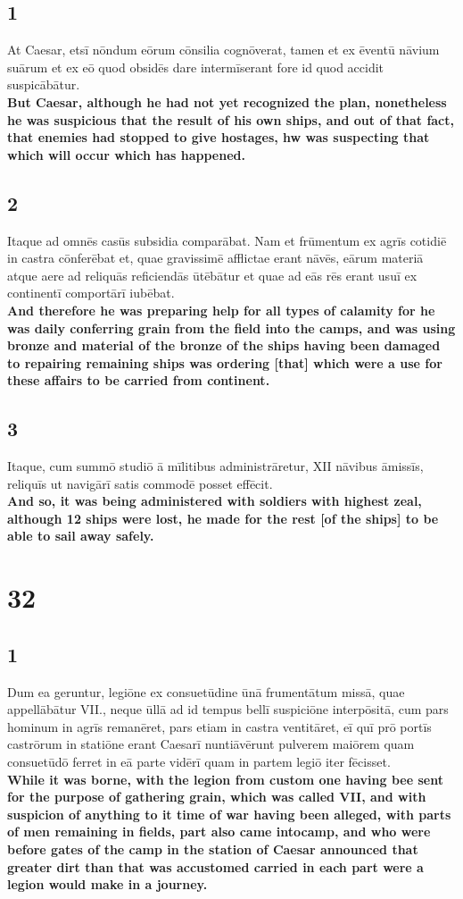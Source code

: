 \documentclass{article}
\begin{document}
\subsection*{1}
At Caesar, etsī nōndum eōrum cōnsilia cognōverat, tamen et ex ēventū nāvium suārum et ex eō quod obsidēs dare intermīserant fore id quod accidit suspicābātur. \\
\textbf{But Caesar, although he had not yet recognized the plan, nonetheless he was suspicious that the result of his own ships, and out of that fact, that enemies had stopped to give hostages, hw was suspecting that which will occur which has happened. }

\subsection*{2}
Itaque ad omnēs casūs subsidia comparābat. Nam et frūmentum ex agrīs cotidiē in castra cōnferēbat et, quae gravissimē afflictae erant nāvēs, eārum materiā atque aere ad reliquās reficiendās ūtēbātur et quae ad eās rēs erant usuī ex continentī comportārī iubēbat. \\
\textbf{And therefore he was preparing help for all types of calamity for he was daily conferring grain from the field into the camps, and was using bronze and material of the bronze of the ships having been damaged to repairing remaining ships was ordering [that] which were a use for these affairs  to be carried from continent.}

\subsection*{3}
Itaque, cum summō studiō ā mīlitibus administrāretur, XII nāvibus āmissīs, reliquīs ut navigārī satis commodē posset effēcit.\\
\textbf{And so, it was being administered with soldiers with highest zeal, although 12 ships were lost, he made for the rest [of the ships] to be able to sail away safely.}


\section*{32}
\subsection*{1}
Dum ea geruntur, legiōne ex consuetūdine ūnā frumentātum missā, quae appellābātur VII., neque ūllā ad id tempus bellī suspiciōne interpōsitā, cum pars hominum in agrīs remanēret, pars etiam in castra ventitāret, eī quī prō portīs castrōrum in statiōne erant Caesarī nuntiāvērunt pulverem maiōrem quam consuetūdō ferret in eā parte vidērī quam in partem legiō iter fēcisset.\\
\textbf{While it was borne, with the legion from custom one having bee sent for the purpose of gathering grain, which was called VII, and with suspicion of anything to it time of war having been alleged, with parts of men remaining in fields, part also came intocamp, and who were before gates of the camp in the station of Caesar announced that greater dirt than that was accustomed carried in each part were a legion would make in a journey. }
\end{document}
